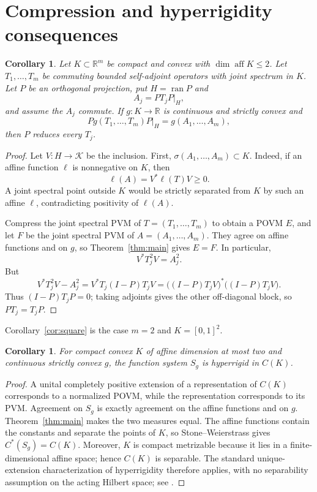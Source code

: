 \documentclass[11pt,a4paper]{amsart}
\newtheorem{corollary}[theorem]{Corollary}
\theoremstyle{remark}
\newcommand{\aff}{\operatorname{aff}}
\newcommand{\ran}{\operatorname{ran}}
\newcommand{\calK}{\mathcal K}
\begin{document}
\section{Compression and hyperrigidity consequences}

\begin{corollary}\label{cor:tuple}
Let \(K\subset\mathbb R^m\) be compact and convex with
\(\dim\aff K\leq2\).  Let \(T_1,\ldots,T_m\) be commuting bounded
self-adjoint operators with joint spectrum in \(K\).  Let \(P\) be an
orthogonal projection, put \(H=\ran P\) and
\[
 A_j=PT_jP|_H,
\]
and assume the \(A_j\) commute.  If \(g\colon K\to\mathbb R\) is continuous
and strictly convex and
\[
 Pg(T_1,\ldots,T_m)P|_H=g(A_1,\ldots,A_m),
\]
then \(P\) reduces every \(T_j\).
\end{corollary}

\begin{proof}
Let \(V\colon H\to\calK\) be the inclusion.  First,
\(\sigma(A_1,\ldots,A_m)\subset K\).  Indeed, if an affine function
\(\ell\) is nonnegative on \(K\), then
\[
 \ell(A)=V^*\ell(T)V\geq0.
\]
A joint spectral point outside \(K\) would be strictly separated from \(K\)
by such an affine \(\ell\), contradicting positivity of \(\ell(A)\).

Compress the joint spectral PVM of \(T=(T_1,\ldots,T_m)\) to obtain a POVM
\(E\), and let \(F\) be the joint spectral PVM of \(A=(A_1,\ldots,A_m)\).
They agree on affine functions and on \(g\), so
Theorem~\ref{thm:main} gives \(E=F\).  In particular,
\[
 V^*T_j^2V=A_j^2.
\]
But
\[
 V^*T_j^2V-A_j^2
 =V^*T_j(I-P)T_jV
 =\bigl((I-P)T_jV\bigr)^*\bigl((I-P)T_jV\bigr).
\]
Thus \((I-P)T_jP=0\); taking adjoints gives the other off-diagonal block, so
\(PT_j=T_jP\).
\end{proof}

Corollary~\ref{cor:square} is the case \(m=2\) and \(K=[0,1]^2\).

\begin{corollary}\label{cor:hyperrigid}
For compact convex \(K\) of affine dimension at most two and continuous
strictly convex \(g\), the function system \(S_g\) is hyperrigid in \(C(K)\).
\end{corollary}

\begin{proof}
A unital completely positive extension of a representation of \(C(K)\)
corresponds to a normalized POVM, while the representation corresponds to
its PVM.  Agreement on \(S_g\) is exactly agreement on the affine functions
and on \(g\).  Theorem~\ref{thm:main} makes the two measures equal.  The
affine functions contain the constants and separate the points of \(K\), so
Stone--Weierstrass gives \(C^*(S_g)=C(K)\).  Moreover, \(K\) is compact
metrizable because it lies in a finite-dimensional affine space; hence
\(C(K)\) is separable.  The standard unique-extension characterization of
hyperrigidity therefore applies, with no separability assumption on the
acting Hilbert space; see
\cite{DavidsonKennedy,PietrzyckiStochel}.
\end{proof}
\end{document}
